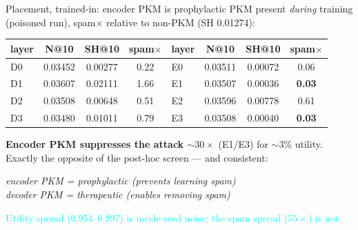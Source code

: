 \documentclass{beamer}
\newcommand{\pierre}[1]{\textcolor{cyan}{#1}}
\begin{document}
\begin{frame}{Placement, trained-in: encoder PKM is prophylactic}
PKM present \emph{during} training (poisoned run), spam$\times$ relative to
non-PKM (SH 0.01274):
\begin{center}
\small
\begin{tabular}{|l|c|c|c||l|c|c|c|}
\hline
layer & N@10 & SH@10 & spam$\times$ & layer & N@10 & SH@10 & spam$\times$ \\
\hline
D0 & 0.03452 & 0.00277 & 0.22 & E0 & 0.03511 & 0.00072 & 0.06 \\
D1 & 0.03607 & 0.02111 & \alert{1.66} & E1 & 0.03507 & 0.00036 & \textbf{0.03} \\
D2 & 0.03508 & 0.00648 & 0.51 & E2 & 0.03596 & 0.00778 & 0.61 \\
D3 & 0.03480 & 0.01011 & 0.79 & E3 & 0.03508 & 0.00040 & \textbf{0.03} \\
\hline
\end{tabular}
\end{center}

\medskip
\textbf{Encoder PKM suppresses the attack $\sim 30\times$} (E1/E3) for $\sim$3\%
utility. Exactly the opposite of the post-hoc screen --- and consistent:

\begin{center}
\emph{encoder PKM = prophylactic (prevents learning spam)}\\
\emph{decoder PKM = therapeutic (enables removing spam)}
\end{center}

\pierre{Utility spread (0.954--0.997) is inside seed noise; the spam spread
($55\times$) is not.}
\end{frame}
\end{document}
